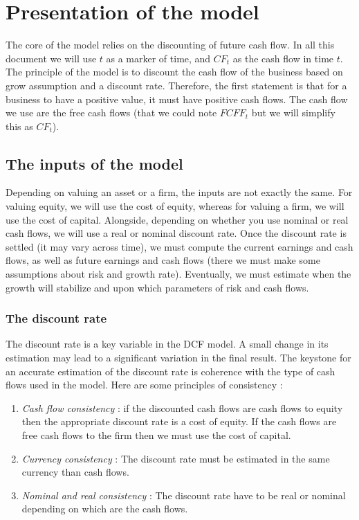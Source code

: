 \chapter{Presentation of the model}


The core of the model relies on the discounting of future cash flow. In all this document we will use $t$ as a marker of time, and $CF_t$ as the cash flow in time $t$. The principle of the model is to discount the cash flow of the business based on grow assumption and a discount rate. Therefore, the first statement is that for a business to have a positive value, it must have positive cash flows. The cash flow we use are the free cash flows (that we could note $FCFF_t$ but we will simplify this as $CF_t$). 

\section{The inputs of the model}

Depending on valuing an asset or a firm, the inputs are not exactly the same. For valuing equity, we will use the cost of equity, whereas for valuing a firm, we will use the cost of capital. Alongside, depending on whether you use nominal or real cash flows, we will use a real or nominal discount rate. Once the discount rate is settled (it may vary across time), we must compute the current earnings and cash flows, as well as future earnings and cash flows (there we must make some assumptions about risk and growth rate). Eventually, we must estimate when the growth will stabilize and upon which parameters of risk and cash flows.   

\subsection{The discount rate}

The discount rate is a key variable in the DCF model. A small change in its estimation may lead to a significant variation in the final result. The keystone for an accurate estimation of the discount rate is coherence with the type of cash flows used in the model. Here are some principles of consistency : 

\begin{enumerate}[label=(\alph*)]
    \item \textit{Cash flow consistency} : if the discounted cash flows are cash flows to equity then the appropriate discount rate is a cost of equity. If the cash flows are free cash flows to the firm then we must use the cost of capital.

    \item \textit{Currency consistency} : The discount rate must be estimated in the same currency than cash flows.

    \item  \textit{Nominal and real consistency} : The discount rate have to be real or nominal depending on which are the cash flows.
\end{enumerate}

